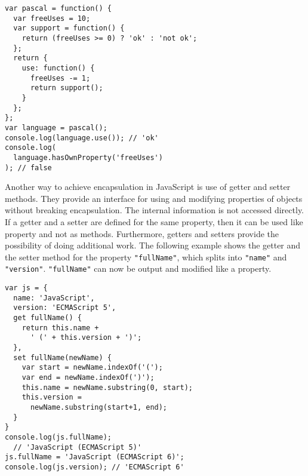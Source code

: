 \documentclass{bioinfo}
\begin{document}
\begin{lstlisting}
var pascal = function() {
  var freeUses = 10;
  var support = function() {
    return (freeUses >= 0) ? 'ok' : 'not ok';
  };
  return {
    use: function() {
      freeUses -= 1;
      return support();
    }
  };
};
var language = pascal();
console.log(language.use()); // 'ok'
console.log(
  language.hasOwnProperty('freeUses')
); // false
\end{lstlisting}

Another way to achieve encapsulation in JavaScript is use of getter and setter methods. They provide an interface for using and modifying properties of objects without breaking encapsulation. The internal information is not accessed directly. If a getter and a setter are defined for the same property, then it can be used like property and not as methods. Furthermore, getters and setters provide the possibility of doing additional work. The following example shows the getter and the setter method for the property \texttt{"fullName"}, which splits into \texttt{"name"} and \texttt{"version"}. \texttt{"fullName"} can now be output and modified like a property.
\begin{lstlisting}
var js = {
  name: 'JavaScript',
  version: 'ECMAScript 5',
  get fullName() {
    return this.name +
      ' (' + this.version + ')';
  },
  set fullName(newName) {
    var start = newName.indexOf('(');
    var end = newName.indexOf(')');
    this.name = newName.substring(0, start);
    this.version = 
      newName.substring(start+1, end);
  }
}
console.log(js.fullName);
  // 'JavaScript (ECMAScript 5)'
js.fullName = 'JavaScript (ECMAScript 6)';
console.log(js.version); // 'ECMAScript 6'
\end{lstlisting}
\end{document}
